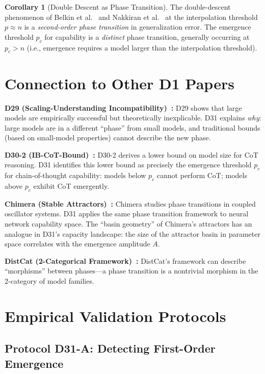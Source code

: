 \documentclass[12pt]{article}
\theoremstyle{definition}
\newtheorem{corollary}[definition]{Corollary}
\theoremstyle{remark}
\begin{document}
\begin{corollary}[Double Descent as Phase Transition]\label{cor:double-descent}
The double-descent phenomenon of Belkin et al.~\cite{belkin2019reconciling} and Nakkiran et al.~\cite{nakkiran2020deep} at the interpolation threshold $p \approx n$ is a \emph{second-order phase transition} in generalization error. The emergence threshold $p_c$ for capability is a \emph{distinct} phase transition, generally occurring at $p_c > n$ (i.e., emergence requires a model larger than the interpolation threshold).
\end{corollary}

\section{Connection to Other D1 Papers}

\textbf{D29 (Scaling-Understanding Incompatibility)~\cite{lu2026-d29}:} D29 shows that large models are empirically successful but theoretically inexplicable. D31 explains \emph{why}: large models are in a different ``phase'' from small models, and traditional bounds (based on small-model properties) cannot describe the new phase.

\textbf{D30-2 (IB-CoT-Bound)~\cite{lu2026-d30-2}:} D30-2 derives a lower bound on model size for CoT reasoning. D31 identifies this lower bound as precisely the emergence threshold $p_c$ for chain-of-thought capability: models below $p_c$ cannot perform CoT; models above $p_c$ exhibit CoT emergently.

\textbf{Chimera (Stable Attractors)~\cite{lu2026-chimera}:} Chimera studies phase transitions in coupled oscillator systems. D31 applies the same phase transition framework to neural network capability space. The ``basin geometry'' of Chimera's attractors has an analogue in D31's capacity landscape: the size of the attractor basin in parameter space correlates with the emergence amplitude $A$.

\textbf{DistCat (2-Categorical Framework)~\cite{lu2026-distcat}:} DistCat's framework can describe ``morphisms'' between phases---a phase transition is a nontrivial morphism in the 2-category of model families.

\section{Empirical Validation Protocols}

\subsection{Protocol D31-A: Detecting First-Order Emergence}
\end{document}
